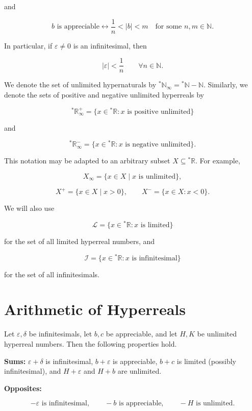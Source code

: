 \documentclass[10pt,a4paper]{book}
\begin{document}
and

$$
    b\text{ is appreciable}
    \leftrightarrow
    \frac1n<|b|<m
    \quad\text{for some }n,m\in\mathbb N.
$$

In particular, if \(\varepsilon\neq0\) is an infinitesimal, then

$$
    |\varepsilon|<\frac1n
    \qquad\forall n\in\mathbb N.
$$


We denote the set of unlimited hypernaturals by
$
    {}^\ast\mathbb N_\infty
        =
        {}^\ast\mathbb N-\mathbb N.
$
Similarly, we denote the sets of positive and negative unlimited hyperreals by

$$
    {}^\ast\mathbb R_\infty^+
    =
    \{x\in{}^\ast\mathbb R:x\text{ is positive unlimited}\}
$$

and

$$
    {}^\ast\mathbb R_\infty^-
    =
    \{x\in{}^\ast\mathbb R:x\text{ is negative unlimited}\}.
$$

This notation may be adapted to an arbitrary subset \(X\subseteq{}^\ast\mathbb
R\). For example,

$$
    X_\infty
    =
    \{x\in X \mid x\text{ is unlimited}\},
$$

$$
    X^+
    =
    \{x\in X \mid x>0\},
    \qquad
    X^-
    =
    \{x\in X:x<0\}.
$$

We will also use

$$
    \mathcal L
    =
    \{x\in{}^\ast\mathbb R:x\text{ is limited}\}
$$

for the set of all limited hyperreal numbers, and

$$
    \mathcal I
    =
    \{x\in{}^\ast\mathbb R:x\text{ is infinitesimal}\}
$$

for the set of all infinitesimals.

\section{Arithmetic of Hyperreals}

Let \(\varepsilon,\delta\) be infinitesimals, let \(b,c\) be appreciable, and
let \(H,K\) be unlimited hyperreal numbers. Then the following properties hold.

\textbf{Sums:} \(\varepsilon+\delta\) is infinitesimal, \(b+\varepsilon\) is appreciable, \(b+c\) is limited (possibly infinitesimal), and \(H+\varepsilon\) and \(H+b\) are unlimited.

\textbf{Opposites:}

$$
    -\varepsilon\text{ is infinitesimal},
    \qquad
    -b\text{ is appreciable},
    \qquad
    -H\text{ is unlimited}.
$$
\end{document}
